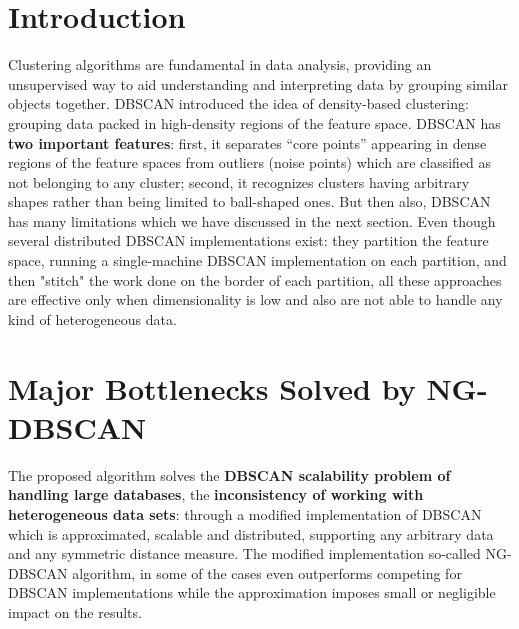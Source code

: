 \documentclass[acmsmall]{acmart}
\begin{document}
\section* {Introduction}
Clustering algorithms are fundamental in data analysis, providing an unsupervised way to aid understanding and interpreting data by grouping similar objects together. \newline DBSCAN introduced the idea of density-based clustering: grouping data packed in high-density regions of the feature space. DBSCAN has \textbf{two important features}: first, it separates “core points” appearing in dense regions of the feature spaces from outliers (noise points) which are classified as not belonging to any cluster; second, it recognizes clusters having arbitrary shapes rather than being limited to ball-shaped ones. But then also, DBSCAN has many limitations which we have discussed in the next section. \newline
Even though several distributed DBSCAN implementations exist: they partition the feature space, running a single-machine DBSCAN implementation on each partition, and then "stitch" the work done on the border of each partition, all these approaches are effective only when dimensionality is low and also are not able to handle any kind of heterogeneous data.

\section* {Major Bottlenecks Solved by NG-DBSCAN}
The proposed algorithm solves the \textbf{DBSCAN scalability problem of handling large databases}, the \textbf{inconsistency of working with heterogeneous data sets}: through a modified implementation of DBSCAN which is approximated, scalable and distributed, supporting any arbitrary data and any symmetric distance measure. The modified implementation so-called NG-DBSCAN algorithm, in some of the cases even outperforms competing for DBSCAN implementations while the approximation imposes small or negligible impact on the results. \newline
\end{document}
